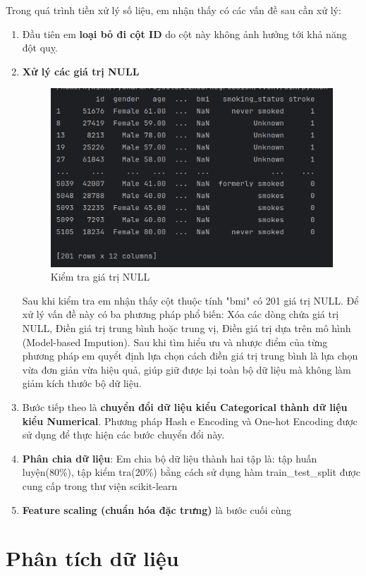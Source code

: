 \documentclass[11pt]{article}
\begin{document}
	Trong quá trình tiền xử lý số liệu, em nhận thấy có các vấn đề sau cần xử lý:
	\begin{enumerate}
		\item Đầu tiên em \textbf{loại bỏ đi cột ID} do cột này không ảnh hưởng tới khả năng đột quỵ.
		\item
		\textbf{Xử lý các giá trị NULL}
		\begin{figure}[H]
			\centering
			\includegraphics[width=0.7\linewidth]{nullCheck}
			\caption{Kiểm tra giá trị NULL}
			\label{fig:nullcheck}
		\end{figure}
		Sau khi kiểm tra em nhận thấy cột thuộc tính "bmi" có 201 giá trị NULL. Để xử lý vấn đề này có ba phương pháp phổ biến: Xóa các dòng chứa giá trị NULL, Điền giá trị trung bình hoặc trung vị, Điền giá trị dựa trên mô hình (Model-based Impution).
		Sau khi tìm hiểu ưu và nhược điểm của từng phương pháp em quyểt định lựa chọn cách điền giá trị trung bình là lựa chọn vừa đơn giản vừa hiệu quả, giúp giữ được lại toàn bộ dữ liệu mà không làm giảm kích thước bộ dữ liệu.
		\item Bước tiếp theo là \textbf{chuyển đổi dữ liệu kiểu Categorical thành dữ liệu kiểu Numerical}. Phương pháp Hash e Encoding và One-hot Encoding được sử dụng để thực hiện các bước chuyển đổi này.
		\item \textbf{Phân chia dữ liệu}: Em chia bộ dữ liệu thành hai tập là: tập huấn luyện(80\%), tập kiểm tra(20\%) bằng cách sử dụng hàm train\_test\_split được cung cấp trong thư viện scikit-learn
		\item \textbf{Feature scaling (chuẩn hóa đặc trưng)} là bước cuối cùng
	\end{enumerate}
	\pagebreak

	\section{Phân tích dữ liệu}
	
\end{document}
